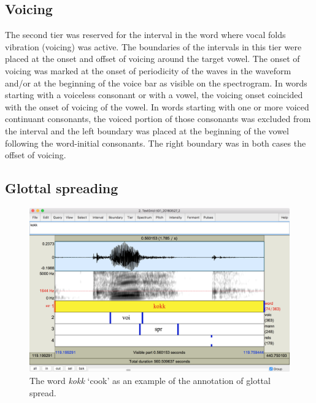 \documentclass[11pt,a4paper,openany]{memoir}\usepackage[]{graphicx}\usepackage[]{color}
\begin{document}
\subsection{Voicing}

The second tier was reserved for the interval in the word where vocal folds vibration (voicing) was active.
The boundaries of the intervals in this tier were placed at the onset and offset of voicing around the target vowel.
The onset of voicing was marked at the onset of periodicity of the waves in the waveform and/or at the beginning of the voice bar as visible on the spectrogram.
In words starting with a voiceless consonant or with a vowel, the voicing onset coincided with the onset of voicing of the vowel.
In words starting with one or more voiced continuant consonants, the voiced portion of those consonants was excluded from the interval and the left boundary was placed at the beginning of the vowel following the word-initial consonants.
The right boundary was in both cases the offset of voicing.

\subsection{Glottal spreading}

\begin{figure}
\centering
\includegraphics[width=\textwidth]{glottal}
\caption{The word \textit{kokk} `cook' as an example of the annotation of glottal spread.}
\label{f:glottal}
\end{figure}
\end{document}
